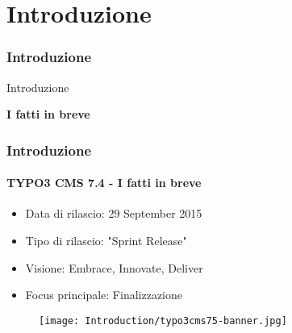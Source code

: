 %

\section{Introduzione}
\begin{frame}[fragile]
	\frametitle{Introduzione}

	\begin{center}\huge{Introduzione}\end{center}
	\begin{center}\huge{\color{typo3darkgrey}\textbf{I fatti in breve}}\end{center}

\end{frame}

\begin{frame}[fragile]
	\frametitle{Introduzione}
	\framesubtitle{TYPO3 CMS 7.4 - I fatti in breve}

	\begin{itemize}
		\item Data di rilascio: 29 September 2015
		\item Tipo di rilascio: "Sprint Release"
		\item Visione: Embrace, Innovate, Deliver
		\item Focus principale: Finalizzazione
	\end{itemize}

	\begin{figure}
		\texttt{[image: Introduction/typo3cms75-banner.jpg]}
	\end{figure}

\end{frame}

